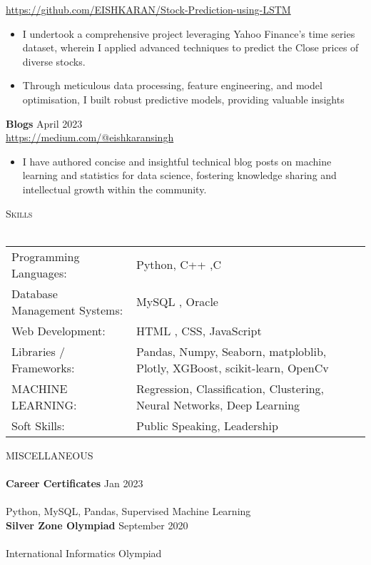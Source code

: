 \documentclass[a4paper]{article}
\newcommand{\lineunder} {
    \vspace*{-8pt} \\
    \hspace*{-18pt} \hrulefill \\
}
\newcommand{\header} [1] {
    {\hspace*{-18pt}\vspace*{6pt} \textsc{#1}}
    \vspace*{-6pt} \lineunder
}
\begin{document}
\vspace{0.5mm}
\url{https://github.com/EISHKARAN/Stock-Prediction-using-LSTM} \\
\vspace{-2mm}
\begin{itemize} 
	\item I undertook a comprehensive project leveraging Yahoo Finance's time series dataset, wherein I applied advanced techniques to predict the Close prices of diverse stocks.
    \item Through meticulous data processing, feature engineering, and model optimisation, I built robust predictive models, providing valuable insights
\end{itemize}
{\textbf{Blogs }} \hfill April 2023\\
\vspace{-1mm}
\url{https://medium.com/@eishkaransingh} \\
\vspace{-2mm}
\begin{itemize} 
    \item I have authored concise and insightful technical blog posts on machine learning and statistics for data science, fostering knowledge sharing and intellectual growth within the community.
\end{itemize}
\header{Skills}
\vspace{2mm}
\begin{tabular}{ l l }
	Programming Languages: & Python, C++ ,C  \\
	\vspace{1mm}
	Database Management Systems: & MySQL , Oracle \\ 
	Web Development:       & HTML , CSS, JavaScript   \\
	Libraries / Frameworks: & Pandas, Numpy, Seaborn, matploblib, Plotly, XGBoost, scikit-learn, OpenCv        \\
	MACHINE LEARNING:             & Regression, Classification, Clustering, Neural Networks, Deep Learning\\
	Soft Skills:           &  Public Speaking, Leadership  \\
	
\end{tabular}


\vspace{2mm}
\header{MISCELLANEOUS}
{\textbf{Career Certificates }} \hfill Jan 2023\\  \\Python, MySQL, Pandas, Supervised Machine Learning\\ 
{\textbf{Silver Zone Olympiad }} \hfill September 2020\\  \\International Informatics Olympiad\\ 
\end{document}
